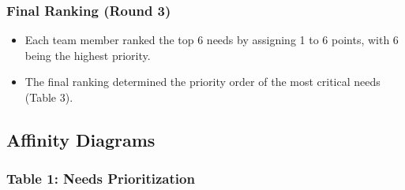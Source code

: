 \documentclass[11pt]{article}
\begin{document}
\subsubsection{Final Ranking (Round 3)}
\begin{itemize}
    \item Each team member ranked the top 6 needs by assigning 1 to 6 points, with 6 being the highest priority.
    \item The final ranking determined the priority order of the most critical needs (Table 3).
\end{itemize}


\newpage
\subsection{Affinity Diagrams}

\subsubsection{Table 1: Needs Prioritization}
\end{document}
